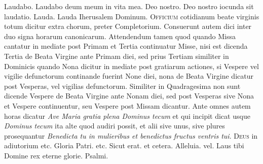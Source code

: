 \begin{multicols*}{2}
 Laudabo.
 Laudabo deum meum in vita mea.
 Deo nostro.
 Deo nostro iocunda sit laudatio.
 Lauda.
 Lauda Iherusalem Dominum.
\color{Red} 
\lettrine[lines=2]{\zallmancaps \color{Blue} O}{fficium} cotidianum beate virginis totum dicitur extra chorum, preter Completorium. Consuerunt autem dici inter duo signa horarum canonicarum. Attendendum tamen quod quando Missa cantatur in mediate post Primam et Tertia continuatur Misse, nisi est dicenda Tertia de Beata Virgine ante Primam diei, sed prius Tertiam similiter in Dominicis quando Nona dicitur in mediate post gratiarum actiones, si Vespere vel vigilie defunctorum continande fuerint None diei, nona de Beata Virgine dicatur post Vesperas, vel vigilias defunctorum. Similiter in Quadragesima non sunt dicende Vespere de Beata Virgine ante Nonam diei, sed post Vesperas sive Nona et Vespere continuentur, seu Vespere post Missam dicantur. Ante omnes autem horas dicatur {\color{black} \textit{Ave Maria gratia plena Dominus tecum}} et qui incipit dicat usque {\color{black} \textit{Dominus tecum}} ita alte quod audiri possit, et alii sive unus, sive plures prosequantur {\color{black} \textit{Benedicta tu in mulieribus et benedictus fructus ventris tui}}. \color{black}
{\color{Red} }
\lettrine[lines=2]{\zallmancaps \color{Red} D}{eus} in adiutorium {\color{Red} etc.} Gloria Patri. {\color{Red} etc.} Sicut erat. {\color{Red} et cetera.} Alleluia. {\color{Red} vel.} Laus tibi Domine rex eterne glorie. {\color{Red} Psalmi.}

\end{multicols*}

